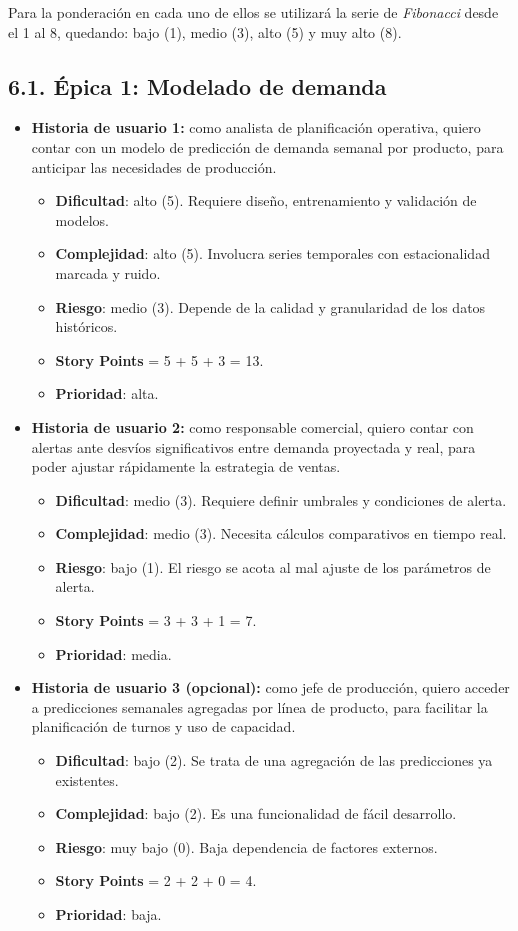 \documentclass[
11pt, %
]{charter}
\begin{document}
Para la ponderación en cada uno de ellos se utilizará la serie de \textit{Fibonacci} desde el 1 al 8, quedando: bajo (1), medio (3), alto (5) y muy alto (8).

\subsection*{6.1. Épica 1: Modelado de demanda}
\begin{itemize}
  \item \textbf{Historia de usuario 1:} como analista de planificación operativa, quiero contar con un modelo de predicción de demanda semanal por producto, para anticipar las necesidades de producción.
    \begin{itemize}
      \item \textbf{Dificultad}: alto (5). Requiere diseño, entrenamiento y validación de modelos.
      \item \textbf{Complejidad}: alto (5). Involucra series temporales con estacionalidad marcada y ruido.
      \item \textbf{Riesgo}: medio (3). Depende de la calidad y granularidad de los datos históricos.
      \item \textbf{Story Points} = 5 + 5 + 3 = 13.
      \item \textbf{Prioridad}: alta.
    \end{itemize}
  \item \textbf{Historia de usuario 2:} como responsable comercial, quiero contar con alertas ante desvíos significativos entre demanda proyectada y real, para poder ajustar rápidamente la estrategia de ventas.
    \begin{itemize}
      \item \textbf{Dificultad}: medio (3). Requiere definir umbrales y condiciones de alerta.
      \item \textbf{Complejidad}: medio (3). Necesita cálculos comparativos en tiempo real.
      \item \textbf{Riesgo}: bajo (1). El riesgo se acota al mal ajuste de los parámetros de alerta.
      \item \textbf{Story Points} = 3 + 3 + 1 = 7.
      \item \textbf{Prioridad}: media.
    \end{itemize}
  \item \textbf{Historia de usuario 3 (opcional):} como jefe de producción, quiero acceder a predicciones semanales agregadas por línea de producto, para facilitar la planificación de turnos y uso de capacidad.
    \begin{itemize}
      \item \textbf{Dificultad}: bajo (2). Se trata de una agregación de las predicciones ya existentes.
      \item \textbf{Complejidad}: bajo (2). Es una funcionalidad de fácil desarrollo.
      \item \textbf{Riesgo}: muy bajo (0). Baja dependencia de factores externos.
      \item \textbf{Story Points} = 2 + 2 + 0 = 4.
      \item \textbf{Prioridad}: baja.
    \end{itemize}
\end{itemize}
\end{document}
